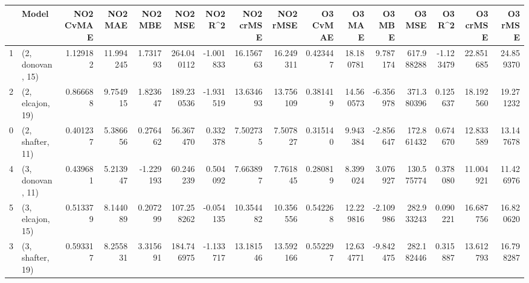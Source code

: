 \begin{tabular}{llrrrrrrrrrrrrrr}
\toprule
{} &             Model &  NO2 CvMAE &    NO2 MAE &   NO2 MBE &     NO2 MSE &   NO2 R\textasciicircum2 &  NO2 crMSE &   NO2 rMSE &  O3 CvMAE &     O3 MAE &    O3 MBE &      O3 MSE &    O3 R\textasciicircum2 &   O3 crMSE &    O3 rMSE \\
\midrule
1 &  (2, donovan, 15) &   1.129182 &  11.994245 &  1.731793 &  264.040112 & -1.001833 &  16.156763 &  16.249311 &  0.423447 &  18.180781 &  9.787174 &  617.988288 & -1.123479 &  22.851685 &  24.859370 \\
2 &  (2, elcajon, 19) &   0.866688 &   9.754915 &  1.823647 &  189.230536 & -1.931519 &  13.634693 &  13.756109 &  0.381419 &  14.560573 & -6.356978 &  371.380396 &  0.125637 &  18.192560 &  19.271232 \\
0 &  (2, shafter, 11) &   0.401237 &   5.386656 &  0.276462 &   56.367470 &  0.332378 &   7.502735 &   7.507827 &  0.315140 &   9.943384 & -2.856647 &  172.861432 &  0.674670 &  12.833589 &  13.147678 \\
4 &  (3, donovan, 11) &   0.439681 &   5.213947 & -1.229193 &   60.246239 &  0.504092 &   7.663897 &   7.761845 &  0.280819 &   8.399024 &  3.076927 &  130.575774 &  0.378080 &  11.004921 &  11.426976 \\
5 &  (3, elcajon, 15) &   0.513379 &   8.144089 &  0.207299 &  107.258262 & -0.054135 &  10.354482 &  10.356556 &  0.542268 &  12.229816 & -2.109986 &  282.933243 &  0.090221 &  16.687756 &  16.820620 \\
3 &  (3, shafter, 19) &   0.593317 &   8.255831 &  3.315691 &  184.746975 & -1.133717 &  13.181546 &  13.592166 &  0.552297 &  12.634771 & -9.842475 &  282.182446 &  0.315887 &  13.612793 &  16.798287 \\
\bottomrule
\end{tabular}
